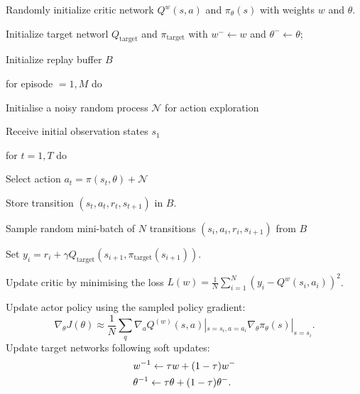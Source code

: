 \documentclass[11pt,a4paper]{article}
\def\N{{\mathcal N}}
\begin{document}
\begin{tcolorbox}[title=DDPG algorithm]
Randomly initialize critic network $Q^w(s,a)$ and $\pi_{\theta}(s)$ with weights $w$ and $\theta$.\par 
Initialize target networl $Q_{\mathrm{target}}$ and $\pi_{\mathrm{target}}$ with $w^{-} \leftarrow w$ and $\theta^{-} \leftarrow \theta$; \par 
Initialize replay buffer $B$ \par 
for episode $=1,M$ do \par 
\hspace{1cm} Initialise a noisy random process $\N$ for action exploration \par 
\hspace{1cm} Receive initial observation states $s_1$ \par 
\hspace{1cm} for $t=1, T$ do \par 
\hspace{2cm} Select action $a_t = \pi(s_t,\theta) +\N$ \par 
\hspace{2cm} Store transition $(s_t,a_t,r_t,s_{t+1})$ in $B$. \par 
\hspace{2cm} Sample random mini-batch of $N$ transitions $(s_i,a_i,r_i,s_{i+1})$ from $B$ \par 
\hspace{2cm} Set $y_i = r_i + \gamma Q_{\mathrm{target}}(s_{i+1}, \pi_{\mathrm{target}}(s_{i+1}))$. \par 
\hspace{2cm} Update critic by minimising the loss $L(w) = \frac{1}{N}\sum_{i=1}^N(y_i -Q^w(s_i,a_i))^2$. \par 
\hspace{2cm} Update actor policy using the sampled policy gradient:
\begin{equation*}
\nabla_{\theta} J(\theta) \approx \frac{1}{N}\sum_q \nabla_a Q^(w)(s,a)|_{s=s_i,a=a_i}\nabla_{\theta}\pi_{\theta}(s)|_{s=s_i}.
\end{equation*}
\hspace{2cm} Update target networks following soft updates:
\begin{equation*}
\aligned 
& w^{-1} \leftarrow \tau w + (1-\tau) w^{-} \\ 
& \theta^{-1} \leftarrow \tau \theta + (1-\tau) \theta^{-}.
\endaligned
\end{equation*}
\end{tcolorbox}







\clearpage


\end{document}
